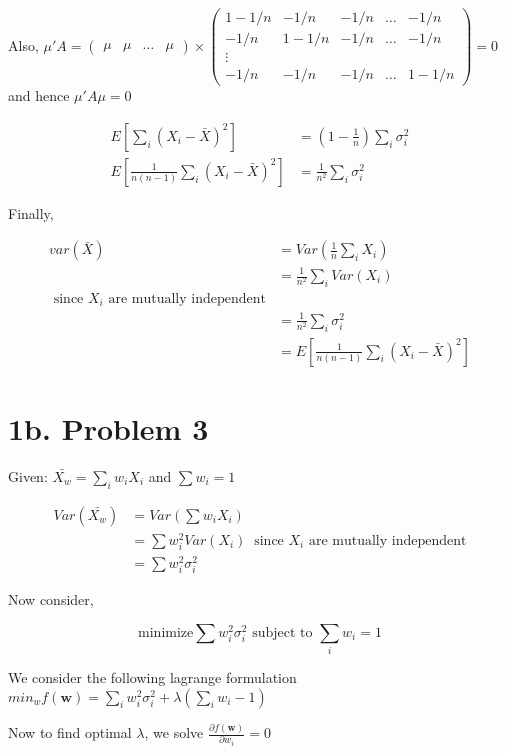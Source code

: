 \documentclass[a4paper]{article}
\begin{document}
Also, $\mu'A = \begin{pmatrix} \mu & \mu & \dots & \mu \end{pmatrix} \times \begin{pmatrix}1-1/n & -1/n & -1/n & \dots & -1/n\\
-1/n & 1-1/n & -1/n & \dots & -1/n\\
\vdots\\
-1/n & -1/n & -1/n & \dots & 1-1/n
\end{pmatrix} = 0 $ and hence $\mu'A\mu=0$

\begin{align*}
E[\sum_i(X_i-\bar{X})^2] &= (1-\frac{1}{n})\sum_i \sigma_i^2  \\
E[\frac{1}{n(n-1)}\sum_i(X_i-\bar{X})^2]  &= \frac{1}{n^2} \sum_i \sigma_i^2
\end{align*}

Finally,

\begin{align*}
var(\bar{X}) &= Var(\frac{1}{n}\sum_i X_i)\\
&= \frac{1}{n^2} \sum_i Var(X_i)\\ \text{ since $X_i$ are mutually independent}\\
&= \frac{1}{n^2}\sum_i \sigma_i^2\\
&= E[\frac{1}{n(n-1)}\sum_i(X_i-\bar{X})^2]
\end{align*}

\section*{1b. Problem 3}

Given: $\bar{X_w} = \sum_i w_i X_i $ and $\sum w_i =1 $

\begin{align*}
Var(\bar{X_w}) &= Var(\sum w_i X_i)\\
&= \sum w_i^2Var(X_i)\ \text{ since $X_i$ are mutually independent}\\
&= \sum w_i^2 \sigma_i^2
\end{align*}

Now consider,

$$
\text{minimize} \sum w_i^2\sigma_i^2 \text{ subject to } \sum_i w_i =1
$$

We consider the following lagrange formulation $min_w f(\mathbf{w}) = \sum_i w_i^2\sigma_i^2 +\lambda(\sum_iw_i-1) $

Now to find optimal $\lambda$, we solve $\frac{\partial f(\mathbf{w})}{\partial w_i} = 0$
\end{document}
